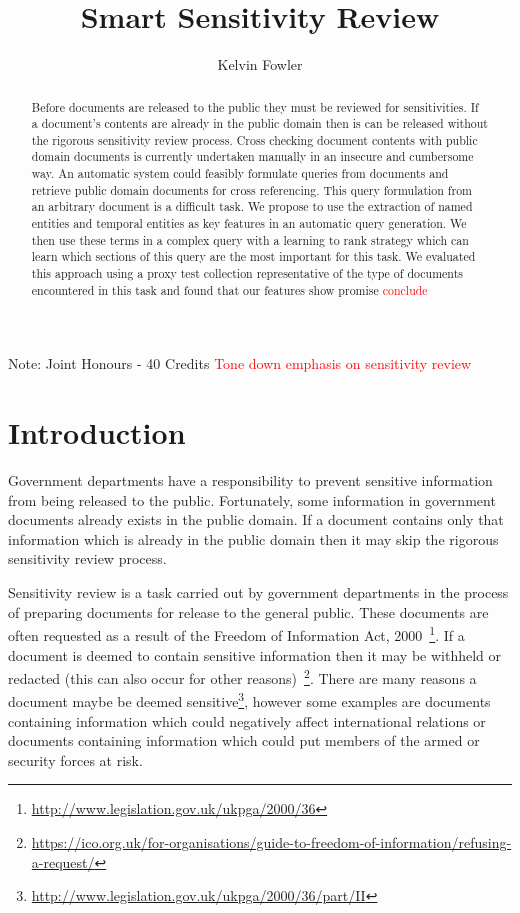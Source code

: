 \documentclass{mpaper}
\newcommand{\remove}[1]{\textcolor{red}{#1}}
\begin{document}
\title{Smart Sensitivity Review}
\author{Kelvin Fowler}

\maketitle
\small{Note: Joint Honours - 40 Credits}
\remove{Tone down emphasis on sensitivity review}
\begin{abstract}
Before documents are released to the public they must be reviewed for sensitivities. If a document's contents are already in the public domain then is can be released without the rigorous sensitivity review process.
Cross checking document contents with public domain documents is currently undertaken manually in an insecure and cumbersome way.
An automatic system could feasibly formulate queries from documents and retrieve public domain documents for cross referencing.
This query formulation from an arbitrary document is a difficult task.
We propose to use the extraction of named entities and temporal entities as key features in an automatic query generation.
We then use these terms in a complex query with a learning to rank strategy which can learn which sections of this query are the most important for this task.
We evaluated this approach using a proxy test collection representative of the type of documents encountered in this task and found that our features show promise \remove{conclude}
\end{abstract}

\section{Introduction} \label{sec:intro}
Government departments have a responsibility to prevent sensitive information from being released to the public. Fortunately, some information in government documents already exists in the public domain. If a document contains only that information which is already in the public domain then it may skip the rigorous sensitivity review process.

Sensitivity review is a task carried out by government departments in the process of preparing documents for release to the general public. 
These documents are often requested as a result of the Freedom of Information Act, 2000~\footnote{\url{http://www.legislation.gov.uk/ukpga/2000/36}}. 
If a document is deemed to contain sensitive information then it may be withheld or redacted (this can also occur for other reasons)~\footnote{\url{https://ico.org.uk/for-organisations/guide-to-freedom-of-information/refusing-a-request/}}.
There are many reasons a document maybe be deemed sensitive\footnote{\url{http://www.legislation.gov.uk/ukpga/2000/36/part/II}}, however some examples are documents containing information which could negatively affect international relations or documents containing information which could put members of the armed or security forces at risk.
\end{document}
